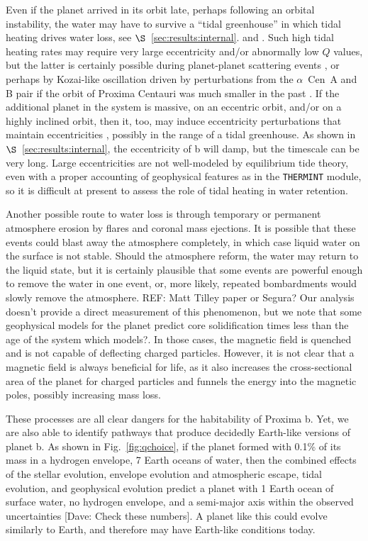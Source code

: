 \documentclass[preprint,12pt]{aastex}
\newcommand{\xxx}[1]{{\color{red} #1}} %
\newcommand{\xxx}[1]{{\color{red} #1}} %
\def\acen{{$\alpha$~Cen}}
\def\thermint{\texttt{\footnotesize{THERMINT}}\xspace}
\begin{document}
Even if the planet arrived in its orbit late, perhaps following an
orbital instability, the water may have to survive a ``tidal
greenhouse'' in which tidal heating drives water loss, see
$\S$~\ref{sec:results:internal}. and \citep{Barnes13}. Such high tidal heating
rates may require very large eccentricity and/or abnormally low $Q$
values, but the latter is \xxx{certainly} possible during planet-planet
scattering events \citep{Chatterjee08}, or perhaps by Kozai-like
oscillation driven by perturbations from the \acen~A and B pair if the
orbit of Proxima Centauri was much smaller in the past
\citep{DesideraBarbieri07}. If the additional planet in the system is
massive, on an eccentric orbit, and/or on a highly inclined orbit,
then it, too, may induce eccentricity perturbations that maintain
eccentricities \cite{TakedaRasio05}, possibly in the range of a tidal
greenhouse. As shown in $\S$~\ref{sec:results:internal}, the eccentricity of
b will damp, but the timescale can be very long. Large eccentricities
are not well-modeled by equilibrium tide theory, even with a proper
accounting of geophysical features as in the \thermint module, so it
is difficult at present to assess the role of tidal heating in water
retention.

Another possible route to water loss is through temporary or permanent
atmosphere erosion by flares and coronal mass ejections. It is
possible that these events could blast away the atmosphere completely,
in which case liquid water on the surface is not stable. Should the
atmosphere reform, the water may return to the liquid state, but it is
certainly plausible that some events are powerful enough to remove the
water in one event, or, more likely, repeated bombardments would
slowly remove the \xxx{atmosphere}. \xxx{REF: Matt Tilley paper or Segura?} Our analysis doesn't provide a direct
measurement of this phenomenon, but we note that some geophysical
models for the planet predict core solidification times less than the
age of the system \xxx{which models?}. In those cases, the magnetic field is quenched and
is not capable of deflecting charged particles. However, it is not
clear that a magnetic field is always beneficial for life, as it also
increases the cross-sectional area of the planet for charged particles
and funnels the energy into the magnetic poles, possibly increasing
mass loss.

These processes are all clear dangers for the habitability of Proxima
b. Yet, we are also able to identify pathways that produce decidedly
Earth-like versions of planet b. \xxx{As shown in Fig.~\ref{fig:qchoice},
if the planet formed with 0.1\% of its mass in a hydrogen envelope, 7
Earth oceans of water, then the combined effects of the stellar
evolution, envelope evolution and atmospheric escape, tidal evolution,
and geophysical evolution predict a planet with 1 Earth ocean of
surface water, no hydrogen envelope, and a semi-major axis within the
observed uncertainties [Dave: Check these numbers]}. A planet like this could evolve similarly to
Earth, and therefore may have Earth-like conditions today.
\end{document}
